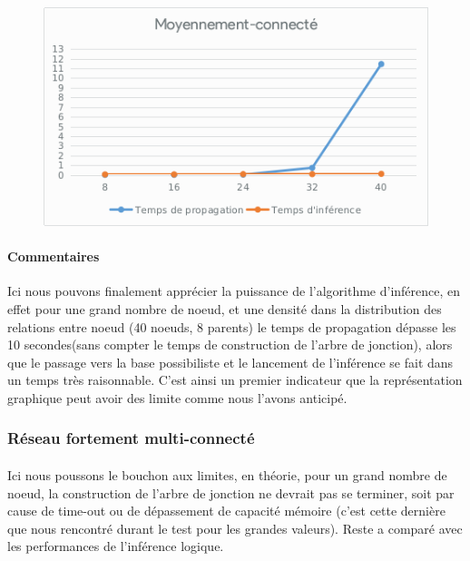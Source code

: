\documentclass[]{report}
\begin{document}
	\begin{figure}[H]
		\centering
		\includegraphics[width=0.75\linewidth]{sheets/medium.png}
	\end{figure}

	\paragraph{Commentaires}
	Ici nous pouvons finalement apprécier la puissance de l'algorithme d'inférence, en effet pour une grand nombre de noeud,
	et une densité dans la distribution des relations entre noeud (40 noeuds, 8 parents) le temps de propagation dépasse les 
	10 secondes(sans compter le temps de construction de l'arbre de jonction), alors que le passage vers la base possibiliste
	et le lancement de l'inférence se fait dans un temps très raisonnable. C'est ainsi un premier indicateur que la représentation
	graphique peut avoir des limite comme nous l'avons anticipé.

	\subsubsection{Réseau fortement multi-connecté}
	\paragraph{}
	Ici nous poussons le bouchon aux limites, en théorie, pour un grand nombre de noeud, la construction de l'arbre de jonction
	ne devrait pas se terminer, soit par cause de time-out ou de dépassement de capacité mémoire (c'est cette dernière que nous
	rencontré durant le test pour les grandes valeurs). Reste a comparé avec les performances de l'inférence logique.
\end{document}
